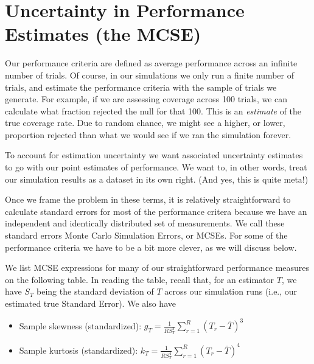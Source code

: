 \documentclass[
]{book}
\providecommand{\tightlist}{%
  \setlength{\itemsep}{0pt}\setlength{\parskip}{0pt}}
\begin{document}
\section{Uncertainty in Performance Estimates (the MCSE)}\label{uncertainty-in-performance-estimates-the-mcse}

Our performance criteria are defined as average performance across an infinite number of trials.
Of course, in our simulations we only run a finite number of trials, and estimate the performance criteria with the sample of trials we generate.
For example, if we are assessing coverage across 100 trials, we can calculate what fraction rejected the null for that 100.
This is an \emph{estimate} of the true coverage rate.
Due to random chance, we might see a higher, or lower, proportion rejected than what we would see if we ran the simulation forever.

To account for estimation uncertainty we want associated uncertainty estimates to go with our point estimates of performance.
We want to, in other words, treat our simulation results as a dataset in its own right.
(And yes, this is quite meta!)

Once we frame the problem in these terms, it is relatively straightforward to calculate standard errors for most of the performance critera because we have an independent and identically distributed set of measurements.
We call these standard errors Monte Carlo Simulation Errors, or MCSEs.
For some of the performance criteria we have to be a bit more clever, as we will discuss below.

We list MCSE expressions for many of our straightforward performance measures on the following table.
In reading the table, recall that, for an estimator \(T\), we have \(S_T\) being the standard deviation of \(T\) across our simulation runs (i.e., our estimated true Standard Error).
We also have

\begin{itemize}
\tightlist
\item
  Sample skewness (standardized): \(\displaystyle{g_T = \frac{1}{R S_T^3}\sum_{r=1}^R \left(T_r - \bar{T}\right)^3}\)
\item
  Sample kurtosis (standardized): \(\displaystyle{k_T = \frac{1}{R S_T^4} \sum_{r=1}^R \left(T_r - \bar{T}\right)^4}\)
\end{itemize}
\end{document}
